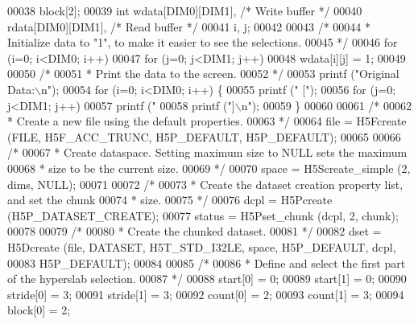 \begin{DoxyCode}
00038                     block[2];
00039     \textcolor{keywordtype}{int}             wdata[DIM0][DIM1],          \textcolor{comment}{/* Write buffer */}
00040                     rdata[DIM0][DIM1],          \textcolor{comment}{/* Read buffer */}
00041                     i, j;
00042 
00043     \textcolor{comment}{/*}
00044 \textcolor{comment}{     * Initialize data to "1", to make it easier to see the selections.}
00045 \textcolor{comment}{     */}
00046     \textcolor{keywordflow}{for} (i=0; i<DIM0; i++)
00047         \textcolor{keywordflow}{for} (j=0; j<DIM1; j++)
00048             wdata[i][j] = 1;
00049 
00050     \textcolor{comment}{/*}
00051 \textcolor{comment}{     * Print the data to the screen.}
00052 \textcolor{comment}{     */}
00053     printf (\textcolor{stringliteral}{"Original Data:\(\backslash\)n"});
00054     \textcolor{keywordflow}{for} (i=0; i<DIM0; i++) \{
00055         printf (\textcolor{stringliteral}{" ["});
00056         \textcolor{keywordflow}{for} (j=0; j<DIM1; j++)
00057             printf (\textcolor{stringliteral}{" %
00058         printf (\textcolor{stringliteral}{"]\(\backslash\)n"});
00059     \}
00060 
00061     \textcolor{comment}{/*}
00062 \textcolor{comment}{     * Create a new file using the default properties.}
00063 \textcolor{comment}{     */}
00064     file = H5Fcreate (FILE, H5F\_ACC\_TRUNC, H5P\_DEFAULT, H5P\_DEFAULT);
00065 
00066     \textcolor{comment}{/*}
00067 \textcolor{comment}{     * Create dataspace.  Setting maximum size to NULL sets the maximum}
00068 \textcolor{comment}{     * size to be the current size.}
00069 \textcolor{comment}{     */}
00070     space = H5Screate\_simple (2, dims, NULL);
00071 
00072     \textcolor{comment}{/*}
00073 \textcolor{comment}{     * Create the dataset creation property list, and set the chunk}
00074 \textcolor{comment}{     * size.}
00075 \textcolor{comment}{     */}
00076     dcpl = H5Pcreate (H5P\_DATASET\_CREATE);
00077     status = H5Pset\_chunk (dcpl, 2, chunk);
00078 
00079     \textcolor{comment}{/*}
00080 \textcolor{comment}{     * Create the chunked dataset.}
00081 \textcolor{comment}{     */}
00082     dset = H5Dcreate (file, DATASET, H5T\_STD\_I32LE, space, H5P\_DEFAULT, dcpl,
00083                 H5P\_DEFAULT);
00084 
00085     \textcolor{comment}{/*}
00086 \textcolor{comment}{     * Define and select the first part of the hyperslab selection.}
00087 \textcolor{comment}{     */}
00088     start[0] = 0;
00089     start[1] = 0;
00090     stride[0] = 3;
00091     stride[1] = 3;
00092     count[0] = 2;
00093     count[1] = 3;
00094     block[0] = 2;
}
\end{DoxyCode}
